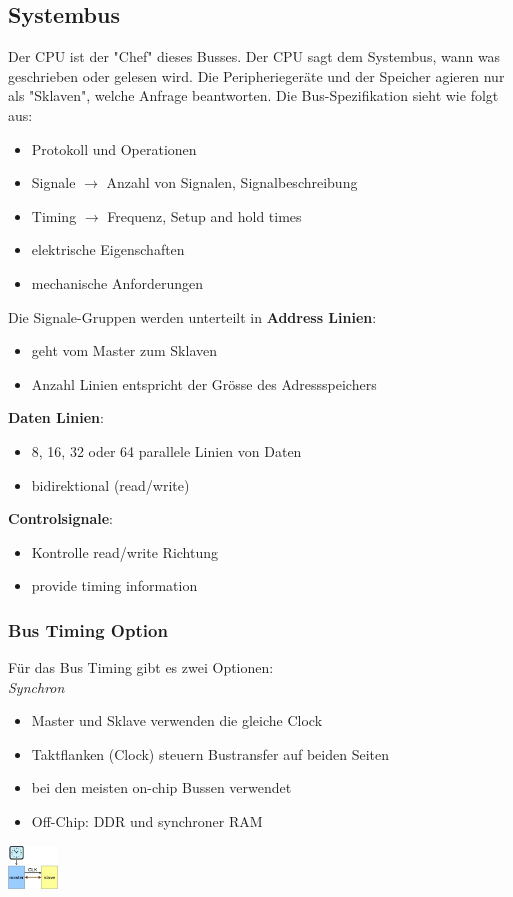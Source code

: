 \documentclass{article}
\newenvironment{Figure}
	{\par\medskip\noindent\minipage{\linewidth}}
	{\endminipage\par\medskip}
\begin{document}
\subsection{Systembus}
Der CPU ist der "Chef" dieses Busses. Der CPU sagt dem Systembus, wann was geschrieben oder gelesen wird. Die Peripheriegeräte und der Speicher agieren nur als "Sklaven", welche Anfrage beantworten. Die Bus-Spezifikation sieht wie folgt aus:
\begin{itemize}
	\item Protokoll und Operationen
	\item Signale $\rightarrow$ Anzahl von Signalen, Signalbeschreibung
	\item Timing $\rightarrow$ Frequenz, Setup and hold times
	\item elektrische Eigenschaften
	\item mechanische Anforderungen
\end{itemize}
Die Signale-Gruppen werden unterteilt in \textbf{Address Linien}:
\begin{itemize}
	\item geht vom Master zum Sklaven 
	\item Anzahl Linien entspricht der Grösse des Adressspeichers
\end{itemize}
\textbf{Daten Linien}:
\begin{itemize}
	\item 8, 16, 32 oder 64 parallele Linien von Daten
	\item bidirektional (read/write)
\end{itemize}
\textbf{Controlsignale}:
\begin{itemize}
	\item Kontrolle read/write Richtung
	\item provide timing information
\end{itemize}

\subsubsection{Bus Timing Option}
Für das Bus Timing gibt es zwei Optionen:\\
\textit{Synchron}\\
\begin{itemize}
\item Master und Sklave verwenden die gleiche Clock
\item Taktflanken (Clock) steuern Bustransfer auf beiden Seiten
\item bei den meisten on-chip Bussen verwendet
\item Off-Chip: DDR und synchroner RAM
\end{itemize}
\begin{Figure}
\centering
\includegraphics[width=50px]{img/BusTimingSynchron.png}
	\label{fig:Synchrones Bus Timing}
\end{Figure}
\end{document}
